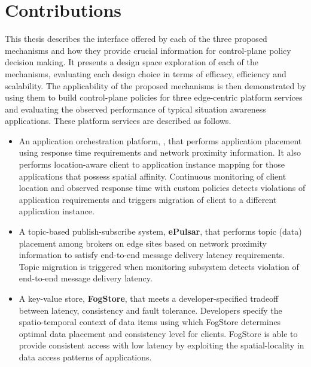 \section{Contributions}
This thesis describes the interface offered by each of the three proposed mechanisms and how they provide crucial information for control-plane policy decision making. It presents a design space exploration of each of the mechanisms, evaluating each design choice in terms of efficacy, efficiency and scalability. The applicability of the proposed mechanisms is then demonstrated by using them to build control-plane policies for three edge-centric platform services and evaluating the observed performance of typical situation awareness applications. These platform services are described as follows.
\begin{itemize}
\item An application orchestration platform, \oneedge{}, that performs application placement using response time requirements and network proximity information. It also performs location-aware client to application instance mapping for those applications that possess spatial affinity. Continuous monitoring of client location and observed response time with custom policies detects violations of application requirements and triggers migration of client to a different application instance. 
\item A topic-based publish-subscribe system, \textbf{ePulsar}, that performs topic (data) placement among brokers on edge sites based on network proximity information to satisfy end-to-end message delivery latency requirements. Topic migration is triggered when monitoring subsystem detects violation of end-to-end message delivery latency.
\item A key-value store, \textbf{FogStore}, that meets a developer-specified tradeoff between latency, consistency and fault tolerance. Developers specify the spatio-temporal context of data items using which FogStore determines optimal data placement and consistency level for clients. FogStore is able to provide consistent access with low latency by exploiting the spatial-locality in data access patterns of applications. 
\end{itemize}

